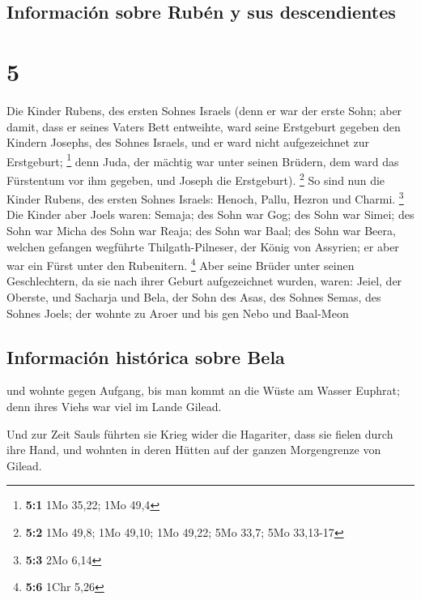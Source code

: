 \hypertarget{informaciuxf3n-sobre-rubuxe9n-y-sus-descendientes}{%
\subsection{Información sobre Rubén y sus
descendientes}\label{informaciuxf3n-sobre-rubuxe9n-y-sus-descendientes}}

\hypertarget{section-4}{%
\section{5}\label{section-4}}

 Die Kinder Rubens, des ersten Sohnes Israels (denn er war
der erste Sohn; aber damit, dass er seines Vaters Bett entweihte, ward
seine Erstgeburt gegeben den Kindern Josephs, des Sohnes Israels, und er
ward nicht aufgezeichnet zur Erstgeburt; \footnote{\textbf{5:1} 1Mo
  35,22; 1Mo 49,4}  denn Juda, der mächtig war unter
seinen Brüdern, dem ward das Fürstentum vor ihm gegeben, und Joseph die
Erstgeburt). \footnote{\textbf{5:2} 1Mo 49,8; 1Mo 49,10; 1Mo 49,22; 5Mo
  33,7; 5Mo 33,13-17}  So sind nun die Kinder Rubens, des
ersten Sohnes Israels: Henoch, Pallu, Hezron und Charmi. \footnote{\textbf{5:3}
  2Mo 6,14}  Die Kinder aber Joels waren: Semaja; des Sohn
war Gog; des Sohn war Simei;  des Sohn war Micha des Sohn
war Reaja; des Sohn war Baal;  des Sohn war Beera, welchen
gefangen wegführte Thilgath-Pilneser, der König von Assyrien; er aber
war ein Fürst unter den Rubenitern. \footnote{\textbf{5:6} 1Chr 5,26}
 Aber seine Brüder unter seinen Geschlechtern, da sie nach
ihrer Geburt aufgezeichnet wurden, waren: Jeiel, der Oberste, und
Sacharja  und Bela, der Sohn des Asas, des Sohnes Semas,
des Sohnes Joels; der wohnte zu Aroer und bis gen Nebo und Baal-Meon

\hypertarget{informaciuxf3n-histuxf3rica-sobre-bela}{%
\subsection{Información histórica sobre
Bela}\label{informaciuxf3n-histuxf3rica-sobre-bela}}

 und wohnte gegen Aufgang, bis man kommt an die Wüste am
Wasser Euphrat; denn ihres Viehs war viel im Lande Gilead.

 Und zur Zeit Sauls führten sie Krieg wider die
Hagariter, dass sie fielen durch ihre Hand, und wohnten in deren Hütten
auf der ganzen Morgengrenze von Gilead.

